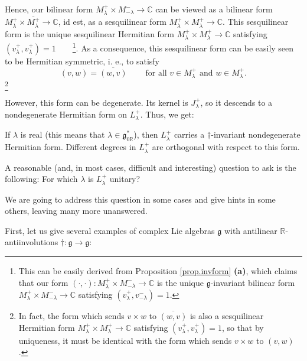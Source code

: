 \documentclass[etingof-lie.tex]{subfiles}
\begin{document}
Hence, our bilinear form $M_{\lambda}^{+}\times M_{-\lambda}^{-}%
\rightarrow\mathbb{C}$ can be viewed as a bilinear form $M_{\lambda}^{+}%
\times\overline{M_{\lambda}^{+}}\rightarrow\mathbb{C}$, id est, as a
sesquilinear form $M_{\lambda}^{+}\times M_{\lambda}^{+}\rightarrow\mathbb{C}%
$. This sesquilinear form is the unique sesquilinear Hermitian form
$M_{\lambda}^{+}\times M_{\lambda}^{+}\rightarrow\mathbb{C}$ satisfying
$\left(  v_{\lambda}^{+},v_{\lambda}^{+}\right)  =1$\ \ \ \ \footnote{This can
be easily derived from Proposition \ref{prop.invform} \textbf{(a)}, which
claims that our form $\left(  \cdot,\cdot\right)  :M_{\lambda}^{+}\times
M_{-\lambda}^{-}\rightarrow\mathbb{C}$ is the unique $\mathfrak{g}$-invariant
bilinear form $M_{\lambda}^{+}\times M_{-\lambda}^{-}\rightarrow\mathbb{C}$
satisfying $\left(  v_{\lambda}^{+},v_{-\lambda}^{-}\right)  =1$.}. As a
consequence, this sesquilinear form can be easily seen to be Hermitian
symmetric, i. e., to satisfy%
\[
\left(  v,w\right)  =\overline{\left(  w,v\right)  }%
\ \ \ \ \ \ \ \ \ \ \text{for all }v\in M_{\lambda}^{+}\text{ and }w\in
M_{\lambda}^{+}.
\]
\footnote{In fact, the form which sends $v\times w$ to $\overline{\left(
w,v\right)  }$ is also a sesquilinear Hermitian form $M_{\lambda}^{+}\times
M_{\lambda}^{+}\rightarrow\mathbb{C}$ satisfying $\left(  v_{\lambda}%
^{+},v_{\lambda}^{+}\right)  =1$, so that by uniqueness, it must be identical
with the form which sends $v\times w$ to $\left(  v,w\right)  $.}

However, this form can be degenerate. Its kernel is $J_{\lambda}^{+}$, so it
descends to a nondegenerate Hermitian form on $L_{\lambda}^{+}$. Thus, we get:

\begin{proposition}
\label{prop.hermitian.lambdareal}If $\lambda$ is real (this means that
$\lambda\in\mathfrak{g}_{0\mathbb{R}}^{\ast}$), then $L_{\lambda}^{+}$ carries
a $\dag$-invariant nondegenerate Hermitian form. Different degrees in
$L_{\lambda}^{+}$ are orthogonal with respect to this form.
\end{proposition}

A reasonable (and, in most cases, difficult and interesting) question to ask
is the following: For which $\lambda$ is $L_{\lambda}^{+}$ unitary?

We are going to address this question in some cases and give hints in some
others, leaving many more unanswered.

First, let us give several examples of complex Lie algebras $\mathfrak{g}$
with antilinear $\mathbb{R}$-antiinvolutions $\dag:\mathfrak{g}\rightarrow
\mathfrak{g}$:
\end{document}
